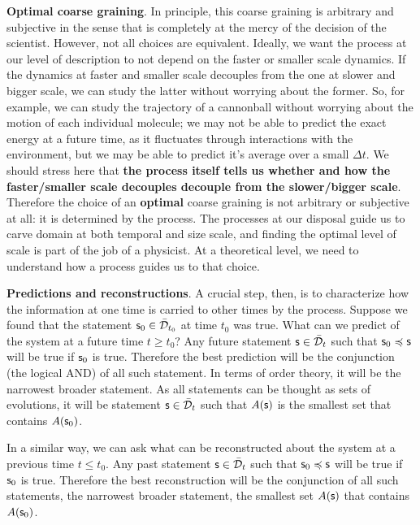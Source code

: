 \documentclass[10pt, onecolumn, longbibliography, nofootinbib]{revtex4-2}
\begin{document}
\textbf{Optimal coarse graining}. In principle, this coarse graining is arbitrary and subjective in the sense that is completely at the mercy of the decision of the scientist. However, not all choices are equivalent. Ideally, we want the process at our level of description to not depend on the faster or smaller scale dynamics. If the dynamics at faster and smaller scale decouples from the one at slower and bigger scale, we can study the latter without worrying about the former. So, for example, we can study the trajectory of a cannonball without worrying about the motion of each individual molecule; we may not be able to predict the exact energy at a future time, as it fluctuates through interactions with the environment, but we may be able to predict it's average over a small $\Delta t$. We should stress here that \textbf{the process itself tells us whether and how the faster/smaller scale decouples decouple from the slower/bigger scale}. Therefore the choice of an \textbf{optimal} coarse graining is not arbitrary or subjective at all: it is determined by the process. The processes at our disposal guide us to carve domain at both temporal and size scale, and finding the optimal level of scale is part of the job of a physicist. At a theoretical level, we need to understand how a process guides us to that choice.

\textbf{Predictions and reconstructions}. A crucial step, then, is to characterize how the information at one time is carried to other times by the process. Suppose we found that the statement $\mathsf{s}_0 \in \bar{\mathcal{D}}_{t_0}$ at time $t_0$ was true. What can we predict of the system at a future time $t \geq t_0$? Any future statement $\mathsf{s} \in \bar{\mathcal{D}}_{t}$ such that $\mathsf{s}_0 \preccurlyeq \mathsf{s}$ will be true if $\mathsf{s}_0$ is true. Therefore the best prediction will be the conjunction (the logical AND) of all such statement. In terms of order theory, it will be the narrowest broader statement. As all statements can be thought as sets of evolutions, it will be statement $\mathsf{s} \in \bar{\mathcal{D}}_{t}$ such that $A(\mathsf{s})$ is the smallest set that contains $A(\mathsf{s}_0)$.

In a similar way, we can ask what can be reconstructed about the system at a previous time $t \leq t_0$. Any past statement $\mathsf{s} \in \bar{\mathcal{D}}_{t}$ such that $\mathsf{s}_0 \preccurlyeq \mathsf{s}$ will be true if $\mathsf{s}_0$ is true. Therefore the best reconstruction will be the conjunction of all such statements, the narrowest broader statement, the smallest set $A(\mathsf{s})$ that contains $A(\mathsf{s}_0)$.
\end{document}
